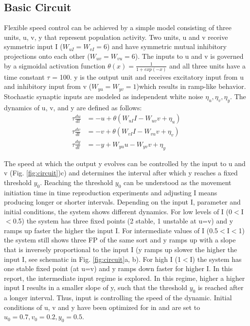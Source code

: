 \documentclass[9pt]{article}
\begin{document}
\subsection{Basic Circuit}
Flexible speed control can be achieved by a simple model consisting of three units, u, v, y that represent population activity. 
Two units, u and v receive symmetric input I ($W_{uI}=W_{vI}=6$) and have symmetric mutual inhibitory projections onto each other ($W_{uv}=W_{vu}=6$). 
The inputs to u and v is governed by a sigmoidal activation function $\theta(x) = \frac{1}{1+exp(-x)}$ and all three units have a time constant $\tau$ = 100. 
y is the output unit and receives excitatory input from u and inhibitory input from v ($W_{yu}=W_{yv}=1$)which results in ramp-like behavior.
Stochastic synaptic inputs are modeled as independent white noise $\eta_u, \eta_v, \eta_y$.
The dynamics of u, v, and y are defined as follows:
\begin{equation} \label{circuit}
	\begin{split}
	\tau\frac{du}{dt} & = -u + \theta(W_{uI}I - W_{uv}v + \eta_u) \\
	\tau\frac{dv}{dt} & = -v + \theta(W_{vI}I - W_{vu}v + \eta_v) \\
	\tau\frac{dy}{dt} & = -y + W_{yu}u - W_{yv}v + \eta_y
	\end{split}
\end{equation}

The speed at which the output y evolves can be controlled by the input to u and v (Fig. \ref{fig:circuit})c) and determines the interval after which y reaches a fixed threshold $y_0$. 
Reaching the threshold $y_0$ can be understood as the movement initiation time in time reproduction experiments and adjusting I means producing longer or shorter intervals.
Depending on the input I, parameter and initial conditions, the system shows different dynamics. For low levels of I (0$<$I$<$0.5) the system has three fixed points (2 stable, 1 unstable at u=v) and y ramps up faster the higher the input I. 
For intermediate values of I (0.5$<$I$<$1) the system still shows three FP of the same sort and y ramps up with a slope that is inversely proportional to the input I (y ramps up slower the higher the input I, see schematic in Fig. \ref{fig:circuit}a, b). 
For high I (1$<$I) the system has one stable fixed point (at u=v) and y ramps down faster for higher I.
In this report, the intermediate input regime is explored. In this regime, higher a higher input I results in a smaller slope of y, such that the threshold $y_0$ is reached after a longer interval. Thus, input is controlling the speed of the dynamic.
Initial conditions of u, v and y have been optimized for in \cite{Egger2020} and are set to $u_0=0.7 , v_0=0.2 , y_0=0.5$.
\end{document}
